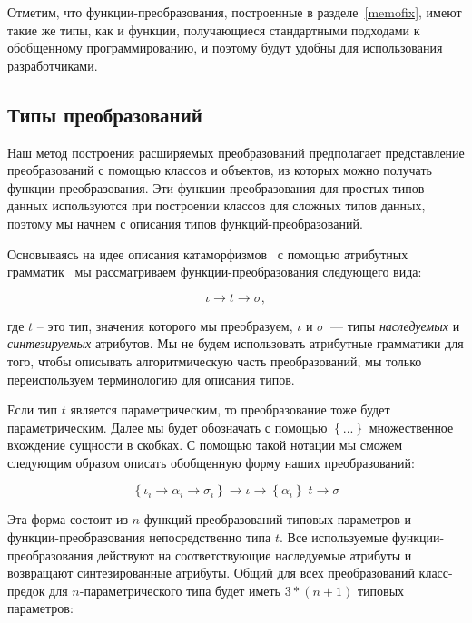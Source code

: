 Отметим, что функции-преобразования, построенные в разделе~\ref{memofix}, имеют такие же типы, как и функции, получающиеся стандартными подходами к обобщенному программированию, и  поэтому будут удобны для использования разработчиками. 

\subsection{Типы преобразований}
\label{transtypes}


Наш метод построения расширяемых преобразований предполагает представление преобразований с помощью классов и объектов, из которых можно получать функции-преобразования. Эти функции-преобразования для простых типов данных используются при построении классов для сложных типов данных, поэтому мы начнем с описания типов функций-преобразований.

Основываясь на идее описания катаморфизмов~\cite{Bananas} с помощью атрибутных 
грамматик~\cite{AGKnuth,ObjectAlgebrasAttribute,AGSwierstra} мы рассматриваем функции-преобразования следующего вида:

\[
\iota \to t \to \sigma,
\]

\noindent где $t$ -- это тип, значения которого мы преобразуем, $\iota$ и $\sigma$~--- типы \emph{наследуемых} и \emph{синтезируемых} атрибутов. 
Мы не будем использовать атрибутные грамматики для того, чтобы описывать алгоритмическую часть преобразований, мы только переиспользуем терминологию для описания типов. 

Если тип $t$ является параметрическим, то преобразование тоже будет параметрическим. Далее мы будет обозначать с помощью
$\left\{...\right\}$ множественное вхождение сущности в скобках. С помощью такой нотации мы сможем следующим образом описать обобщенную форму наших преобразований:

\[
  \left\{\iota_i \to \alpha_i \to \sigma_i\right\}\to\iota \to\left\{\alpha_i\right\}\;t \to \sigma
\]

\noindent Эта форма состоит из $n$ функций-преобразований типовых параметров и функции-преобразования непосредственно типа  $t$. Все используемые функции-преобразования действуют на соответствующие наследуемые атрибуты и возвращают синтезированные атрибуты.
Общий для всех преобразований класс-предок для $n$-параметрического типа будет иметь $3*(n+1)$ типовых параметров:

